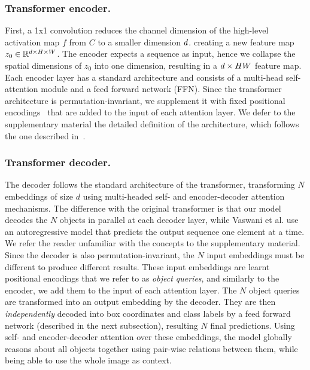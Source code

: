 \subsubsection{Transformer encoder.} First, a 1x1 convolution reduces the channel dimension of the high-level activation map $f$ from $C$ to a smaller dimension $d$. creating a new feature map $z_0 \in \mathbb{R}^{d \times H\times W}$. The encoder expects a sequence as input, hence we collapse the spatial dimensions of $z_0$ into one dimension, resulting in a $d\times HW$ feature map.
Each encoder layer has a standard architecture and consists of a multi-head self-attention module and a feed forward network (FFN). 
Since the transformer architecture is permutation-invariant, we supplement it %
with fixed positional encodings~\cite{Parmar2018ImageT,Bello2019AttentionAC}
that are added to the input of each attention layer.  We defer to the supplementary material the detailed definition of the architecture, which follows the one described in~\cite{Vaswani2017AttentionIA}. 



\subsubsection{Transformer decoder.} 

The decoder follows the standard architecture of the transformer, transforming $N$ embeddings of size $d$ using multi-headed self- and encoder-decoder attention mechanisms. The difference with the original transformer is that our model decodes the $N$ objects in parallel at each decoder layer, while Vaswani et al. \cite{Vaswani2017AttentionIA} use an autoregressive model that predicts the output sequence one element at a time. We refer the reader unfamiliar with the concepts to the supplementary material. %
Since the decoder is also permutation-invariant, the $N$ input embeddings must be different to produce different results. These input embeddings are learnt positional encodings that we refer to as \emph{object queries}, and similarly to the encoder, we add them to the input of each attention layer.
The $N$ object queries are transformed into an output embedding by the decoder. They are then
\emph{independently} decoded into box coordinates and class labels by a %
feed forward network (described in the next subsection), resulting $N$ final predictions. Using self- and encoder-decoder attention over these embeddings, the model globally reasons about all objects %
together using pair-wise relations between them, while being able to use the whole image as context. 


